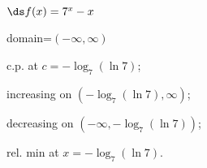 {$\ds f(x) =7^x-x$
}
{domain=$(-\infty,\infty)$

c.p. at $c=-\log_7(\ln 7)$; 

increasing on $\left(-\log_7(\ln 7),\infty\right)$;

decreasing on $\left(-\infty,-\log_7(\ln 7)\right)$;

rel. min at $x=-\log_7(\ln 7)$.
}
